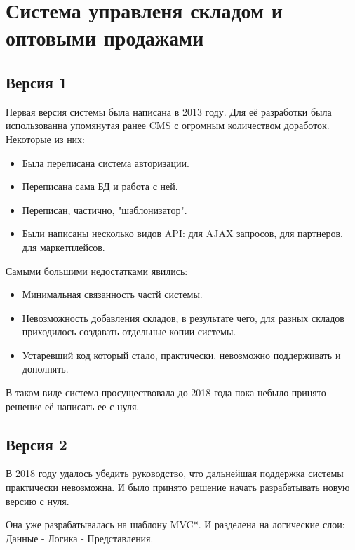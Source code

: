 \documentclass[10pt]{tpl/developercv} %
\begin{document}
\section{Система управленя складом и оптовыми продажами}
\subsection{Версия 1}

Первая версия системы была написана в 2013 году. Для её разработки была использованна упомянутая ранее CMS с огромным количеством доработок. Некоторые из них:
\begin{itemize}
  \item Была переписана система авторизации.
  \item Переписана сама БД и работа с ней.
  \item Переписан, частично, "шаблонизатор".
  \item Были написаны несколько видов API: для AJAX запросов, для партнеров, для маркетплейсов.
\end{itemize}

Самыми большими недостатками явились:
\begin{itemize}
  \item Минимальная связанность частй системы.
  \item Невозможность добавления складов, в результате чего, для разных складов приходилось создавать отдельные копии системы.
  \item Устаревший код который стало, практически, невозможно поддерживать и дополнять.
\end{itemize}

В таком виде система просуществовала до 2018 года пока небыло принято решение её написать ее с нуля.

\subsection{Версия 2}
В 2018 году удалось убедить руководство, что дальнейшая поддержка системы практически невозможна. И было принято решение начать разрабатывать новую версию с нуля.

Она уже разрабатывалась на шаблону MVC*. И разделена на логические слои: Данные - Логика - Представления.
\end{document}
